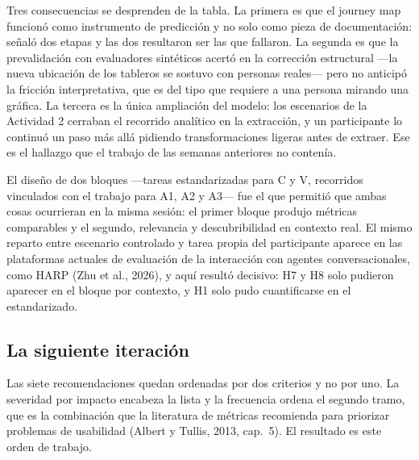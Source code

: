 Tres consecuencias se desprenden de la tabla. La primera es que el journey map funcionó como
instrumento de predicción y no solo como pieza de documentación: señaló dos etapas y las dos
resultaron ser las que fallaron. La segunda es que la prevalidación con evaluadores sintéticos
acertó en la corrección estructural ---la nueva ubicación de los tableros se sostuvo con personas
reales--- pero no anticipó la fricción interpretativa, que es del tipo que requiere a una persona
mirando una gráfica. La tercera es la única ampliación del modelo: los escenarios de la Actividad
2 cerraban el recorrido analítico en la extracción, y un participante lo continuó un paso más allá
pidiendo transformaciones ligeras antes de extraer. Ese es el hallazgo que el trabajo de las
semanas anteriores no contenía.

El diseño de dos bloques ---tareas estandarizadas para C y V, recorridos vinculados con el trabajo
para A1, A2 y A3--- fue el que permitió que ambas cosas ocurrieran en la misma sesión: el primer
bloque produjo métricas comparables y el segundo, relevancia y descubribilidad en contexto real.
El mismo reparto entre escenario controlado y tarea propia del participante aparece en las
plataformas actuales de evaluación de la interacción con agentes conversacionales, como HARP
(Zhu et al., 2026), y aquí resultó decisivo: H7 y H8 solo pudieron aparecer en el bloque por
contexto, y H1 solo pudo cuantificarse en el estandarizado.

\subsection{La siguiente iteración}

Las siete recomendaciones quedan ordenadas por dos criterios y no por uno. La severidad por
impacto encabeza la lista y la frecuencia ordena el segundo tramo, que es la combinación que la
literatura de métricas recomienda para priorizar problemas de usabilidad (Albert y Tullis, 2013,
cap.~5). El resultado es este orden de trabajo.

